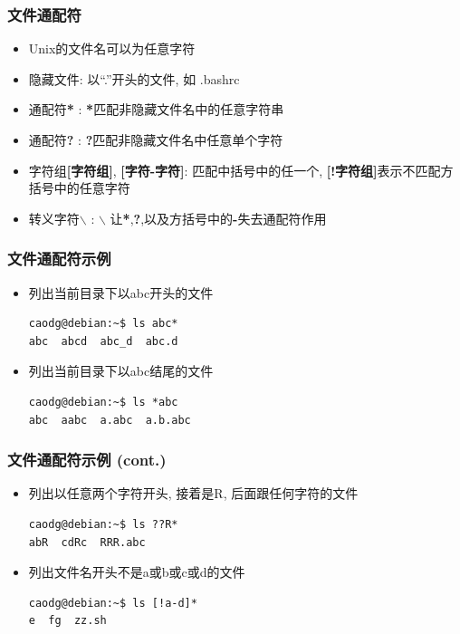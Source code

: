\documentclass[compress]{beamer}
\begin{document}
\begin{frame}
\frametitle{文件通配符}
\begin{itemize}
\item Unix的文件名可以为任意字符
\item 隐藏文件: 以``\alert{.}''开头的文件, 如 \alert{.bashrc}
\item 通配符\alert{\textbf{*}} : \alert{\textbf{*}}匹配非隐藏文件名中的任意字符串
\item 通配符\alert{\textbf{?}} : \alert{\textbf{?}}匹配非隐藏文件名中任意单个字符
\item 字符组\alert{\textbf{[字符组]}}, \alert{\textbf{[字符-字符]}}: 匹配中括号中的任一个,
\alert{\textbf{[!字符组]}}表示不匹配方括号中的任意字符
\item 转义字符\alert{\textbf{$\backslash$}} : \alert{\textbf{$\backslash$}}
让\alert{\textbf{*}},\alert{\textbf{?}},以及方括号中的\alert{\textbf{-}}失去通配符作用
\end{itemize}

\end{frame}

\begin{frame}[containsverbatim]
\frametitle{文件通配符示例}
\begin{itemize}
\item 列出当前目录下以abc开头的文件\\[1ex]
\begin{Verbatim}
caodg@debian:~$ ls abc*
abc  abcd  abc_d  abc.d
\end{Verbatim}

\item 列出当前目录下以abc结尾的文件\\[1ex]
\begin{Verbatim}
caodg@debian:~$ ls *abc
abc  aabc  a.abc  a.b.abc
\end{Verbatim}

\end{itemize}

\end{frame}

\begin{frame}[containsverbatim]
\frametitle{文件通配符示例 (cont.)}
\begin{itemize}

\item 列出以任意两个字符开头, 接着是R,
后面跟任何字符的文件\\[1ex]
\begin{Verbatim}
caodg@debian:~$ ls ??R*
abR  cdRc  RRR.abc
\end{Verbatim}

\item 列出文件名开头不是a或b或c或d的文件\\[1ex]
\begin{Verbatim}
caodg@debian:~$ ls [!a-d]*
e  fg  zz.sh
\end{Verbatim}

\end{itemize}

\end{frame}
\end{document}
